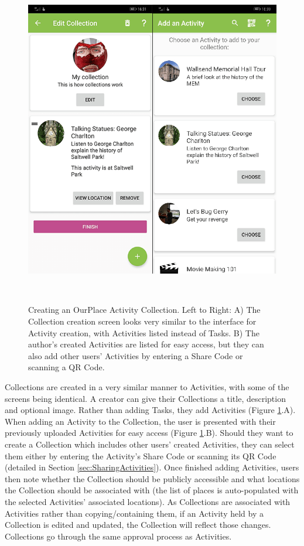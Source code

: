 \begin{figure}
  \centering
  \includegraphics[width=0.55\columnwidth]{images/chapter05/CreateCollection.png}
  \caption[Creating an OurPlace Activity Collection]{Creating an OurPlace Activity Collection. Left to Right: A) The Collection creation screen looks very similar to the interface for Activity creation, with Activities listed instead of Tasks. B) The author's created Activities are listed for easy access, but they can also add other users' Activities by entering a Share Code or scanning a QR Code. }~\label{fig:CollectionCreation}
\end{figure}

Collections are created in a very similar manner to Activities, with some of the screens being identical. A creator can give their Collections a title, description and optional image. Rather than adding Tasks, they add Activities (Figure \ref{fig:CollectionCreation}.A). When adding an Activity to the Collection, the user is presented with their previously uploaded Activities for easy access (Figure \ref{fig:CollectionCreation}.B). Should they want to create a Collection which includes other users' created Activities, they can select them either by entering the Activity's Share Code or scanning its QR Code (detailed in Section \ref{sec:SharingActivities}). Once finished adding Activities, users then note whether the Collection should be publicly accessible and what locations the Collection should be associated with (the list of places is auto-populated with the selected Activities' associated locations). As Collections are associated with Activities rather than copying/containing them, if an Activity held by a Collection is edited and updated, the Collection will reflect those changes. Collections go through the same approval process as Activities.

